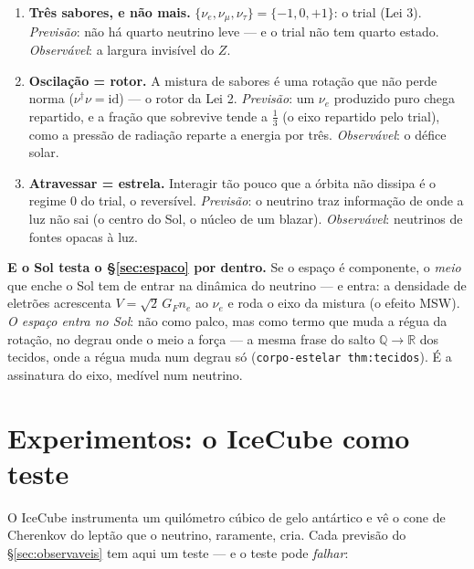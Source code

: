 \documentclass[11pt,a4paper]{article}
\newcommand{\code}[1]{\texttt{\small #1}}
\newcommand{\dg}{^{\dagger}}
\newcommand{\nue}{\nu_e}\newcommand{\num}{\nu_\mu}\newcommand{\nut}{\nu_\tau}
\begin{document}
\begin{enumerate}\itemsep3pt
\item \textbf{Três sabores, e não mais.} $\{\nue,\num,\nut\}=\{-1,0,+1\}$: o trial (Lei 3). \emph{Previsão}:
  não há quarto neutrino leve --- e o trial não tem quarto estado. \emph{Observável}: a largura invisível
  do $Z$.
\item \textbf{Oscilação = rotor.} A mistura de sabores é uma rotação que não perde norma ($\nu\dg\nu=
  \mathrm{id}$) --- o rotor da Lei 2. \emph{Previsão}: um $\nue$ produzido puro chega repartido, e a fração
  que sobrevive tende a $\tfrac13$ (o eixo repartido pelo trial), como a pressão de radiação reparte a
  energia por três. \emph{Observável}: o défice solar.
\item \textbf{Atravessar = estrela.} Interagir tão pouco que a órbita não dissipa é o regime $0$ do trial,
  o reversível. \emph{Previsão}: o neutrino traz informação de onde a luz não sai (o centro do Sol, o
  núcleo de um blazar). \emph{Observável}: neutrinos de fontes opacas à luz.
\end{enumerate}

\noindent \textbf{E o Sol testa o \S\ref{sec:espaco} por dentro.} Se o espaço é componente, o \emph{meio}
que enche o Sol tem de entrar na dinâmica do neutrino --- e entra: a densidade de eletrões acrescenta
$V=\sqrt2\,G_F n_e$ ao $\nue$ e roda o eixo da mistura (o efeito MSW). \emph{O espaço entra no Sol}: não
como palco, mas como termo que muda a régua da rotação, no degrau onde o meio a força --- a mesma frase do
salto $\mathbb{Q}\to\mathbb{R}$ dos tecidos, onde a régua muda num degrau só (\code{corpo-estelar
thm:tecidos}). É a assinatura do eixo, medível num neutrino.

\section{Experimentos: o IceCube como teste}\label{sec:icecube}

O IceCube instrumenta um quilómetro cúbico de gelo antártico e vê o cone de Cherenkov do leptão que o
neutrino, raramente, cria. Cada previsão do \S\ref{sec:observaveis} tem aqui um teste --- e o teste pode
\emph{falhar}:
\end{document}

